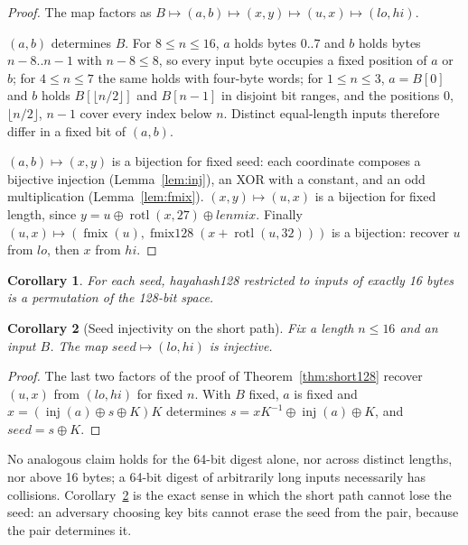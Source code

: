 \documentclass[10pt,a4paper]{article}
\newtheorem{corollary}{Corollary}
\theoremstyle{remark}
\newcommand{\rotl}{\operatorname{rotl}}
\newcommand{\inj}{\operatorname{inj}}
\newcommand{\fmix}{\operatorname{fmix}}
\newcommand{\fmixw}{\operatorname{fmix128}}
\begin{document}
\begin{proof}
The map factors as \(B \mapsto (a,b) \mapsto (x,y) \mapsto (u,x) \mapsto
(\mathit{lo},\mathit{hi})\).

\((a,b)\) determines \(B\).  For \(8 \leq n \leq 16\), \(a\) holds bytes
\(0..7\) and \(b\) holds bytes \(n-8..n-1\) with \(n-8 \leq 8\), so every
input byte occupies a fixed position of \(a\) or \(b\); for \(4 \leq n \leq
7\) the same holds with four-byte words; for \(1 \leq n \leq 3\), \(a =
B[0]\) and \(b\) holds \(B[\lfloor n/2 \rfloor]\) and \(B[n-1]\) in disjoint
bit ranges, and the positions \(0\), \(\lfloor n/2 \rfloor\), \(n-1\) cover
every index below \(n\).  Distinct equal-length inputs therefore differ in a
fixed bit of \((a,b)\).

\((a,b) \mapsto (x,y)\) is a bijection for fixed seed: each coordinate
composes a bijective injection (Lemma~\ref{lem:inj}), an XOR with a constant,
and an odd multiplication (Lemma~\ref{lem:fmix}).  \((x,y) \mapsto (u,x)\) is
a bijection for fixed length, since \(y = u \oplus \rotl(x,27) \oplus
\mathit{lenmix}\).  Finally \((u,x) \mapsto (\fmix(u), \fmixw(x +
\rotl(u,32)))\) is a bijection: recover \(u\) from \(\mathit{lo}\), then
\(x\) from \(\mathit{hi}\).
\end{proof}

\begin{corollary}
\label{cor:perm16}
For each seed, hayahash128 restricted to inputs of exactly 16 bytes is a
permutation of the 128-bit space.
\end{corollary}

\begin{corollary}[Seed injectivity on the short path]
\label{cor:seed}
Fix a length \(n \leq 16\) and an input \(B\).  The map
\(\mathit{seed} \mapsto (\mathit{lo},\mathit{hi})\) is injective.
\end{corollary}

\begin{proof}
The last two factors of the proof of Theorem~\ref{thm:short128} recover
\((u,x)\) from \((\mathit{lo},\mathit{hi})\) for fixed \(n\).  With \(B\)
fixed, \(a\) is fixed and \(x = (\inj(a) \oplus s \oplus K)K\) determines
\(s = xK^{-1} \oplus \inj(a) \oplus K\), and \(\mathit{seed} = s \oplus K\).
\end{proof}

No analogous claim holds for the 64-bit digest alone, nor across distinct
lengths, nor above 16 bytes; a 64-bit digest of arbitrarily long inputs
necessarily has collisions.  Corollary~\ref{cor:seed} is the exact sense in
which the short path cannot lose the seed: an adversary choosing key bits
cannot erase the seed from the pair, because the pair determines it.
\end{document}
